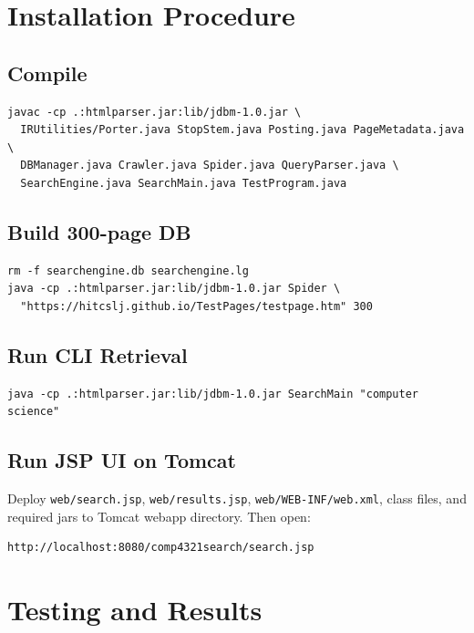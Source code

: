 \documentclass[11pt,a4paper]{article}
\begin{document}
\section{Installation Procedure}

\subsection{Compile}
\begin{verbatim}
javac -cp .:htmlparser.jar:lib/jdbm-1.0.jar \
  IRUtilities/Porter.java StopStem.java Posting.java PageMetadata.java \
  DBManager.java Crawler.java Spider.java QueryParser.java \
  SearchEngine.java SearchMain.java TestProgram.java
\end{verbatim}

\subsection{Build 300-page DB}
\begin{verbatim}
rm -f searchengine.db searchengine.lg
java -cp .:htmlparser.jar:lib/jdbm-1.0.jar Spider \
  "https://hitcslj.github.io/TestPages/testpage.htm" 300
\end{verbatim}

\subsection{Run CLI Retrieval}
\begin{verbatim}
java -cp .:htmlparser.jar:lib/jdbm-1.0.jar SearchMain "computer science"
\end{verbatim}

\subsection{Run JSP UI on Tomcat}
Deploy \texttt{web/search.jsp}, \texttt{web/results.jsp}, \texttt{web/WEB-INF/web.xml}, class files, and required jars to Tomcat webapp directory. Then open:
\begin{verbatim}
http://localhost:8080/comp4321search/search.jsp
\end{verbatim}

\section{Testing and Results}
\end{document}
